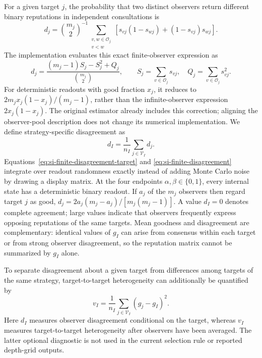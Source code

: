\documentclass[fleqn,10pt]{wlscirep}
\begin{document}
For a given target $j$, the probability that two distinct observers return different binary reputations in independent consultations is
\begin{equation}
d_j=
\binom{m_j}{2}^{-1}
\sum_{\substack{v,w\in\mathcal O_j\\v<w}}
\left[s_{vj}(1-s_{wj})+(1-s_{vj})s_{wj}\right].
\label{eq:si-finite-disagreement-target}
\end{equation}
The implementation evaluates this exact finite-observer expression as
\[
d_j=\frac{(m_j-1)S_j-S_j^2+Q_j}{\binom{m_j}{2}},\qquad
S_j=\sum_{v\in\mathcal O_j}s_{vj},\quad Q_j=\sum_{v\in\mathcal O_j}s_{vj}^2.
\]
For deterministic readouts with good fraction $x_j$, it reduces to $2m_jx_j(1-x_j)/(m_j-1)$, rather than the infinite-observer expression $2x_j(1-x_j)$. The original estimator already includes this correction; aligning the observer-pool description does not change its numerical implementation.
We define strategy-specific disagreement as
\begin{equation}
d_I=\frac{1}{n_I}\sum_{j\in\mathcal V_I}d_j.
\label{eq:si-finite-disagreement}
\end{equation}
Equations~\eqref{eq:si-finite-disagreement-target} and \eqref{eq:si-finite-disagreement} integrate over readout randomness exactly instead of adding Monte Carlo noise by drawing a display matrix. At the four endpoints $\alpha,\beta\in\{0,1\}$, every internal state has a deterministic binary readout. If $a_j$ of the $m_j$ observers then regard target $j$ as good, $d_j=2a_j(m_j-a_j)/[m_j(m_j-1)]$. A value $d_I=0$ denotes complete agreement; large values indicate that observers frequently express opposing reputations of the same targets. Mean goodness and disagreement are complementary: identical values of $g_I$ can arise from consensus within each target or from strong observer disagreement, so the reputation matrix cannot be summarized by $g_I$ alone.

To separate disagreement about a given target from differences among targets of the same strategy, target-to-target heterogeneity can additionally be quantified by
\begin{equation}
v_I=\frac{1}{n_I}\sum_{j\in\mathcal V_I}(g_j-g_I)^2.
\label{eq:si-finite-target-variance}
\end{equation}
Here $d_I$ measures observer disagreement conditional on the target, whereas $v_I$ measures target-to-target heterogeneity after observers have been averaged. The latter optional diagnostic is not used in the current selection rule or reported depth-grid outputs.
\end{document}

